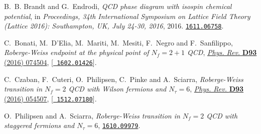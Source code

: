 \documentclass{PoS}
\begin{document}
\begin{thebibliography}{100}
B.~B. Brandt and G.~Endrodi, \emph{{QCD phase diagram with isospin chemical
  potential}},  in \emph{{Proceedings, 34th International Symposium on Lattice
  Field Theory (Lattice 2016): Southampton, UK, July 24-30, 2016}}, 2016.
\newblock \href{https://arxiv.org/abs/1611.06758}{{\tt 1611.06758}}.

C.~Bonati, M.~D'Elia, M.~Mariti, M.~Mesiti, F.~Negro and F.~Sanfilippo,
  \emph{{Roberge-Weiss endpoint at the physical point of $N_f = 2+1$ QCD}},
  \href{http://dx.doi.org/10.1103/PhysRevD.93.074504}{\emph{Phys. Rev.} {\bf
  D93} (2016) 074504}, [\href{https://arxiv.org/abs/1602.01426}{{\tt
  1602.01426}}].

C.~Czaban, F.~Cuteri, O.~Philipsen, C.~Pinke and A.~Sciarra,
  \emph{{Roberge-Weiss transition in $N_f=2$ QCD with Wilson fermions and
  $N_\tau=6$}}, \href{http://dx.doi.org/10.1103/PhysRevD.93.054507}{\emph{Phys.
  Rev.} {\bf D93} (2016) 054507}, [\href{https://arxiv.org/abs/1512.07180}{{\tt
  1512.07180}}].

O.~Philipsen and A.~Sciarra, \emph{{Roberge-Weiss transition in $N_f=2$ QCD
  with staggered fermions and $N_\tau=6$}},
\newblock \href{https://arxiv.org/abs/1610.09979}{{\tt 1610.09979}}.

\end{thebibliography}\endgroup
\end{document}
